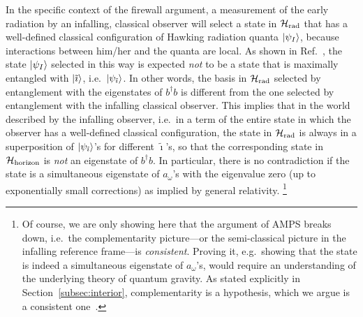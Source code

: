 \documentclass[12pt]{article}
\begin{document}
In the specific context of the firewall argument, a measurement of 
the early radiation by an infalling, classical observer will select 
a state in ${\cal H}_{\rm rad}$ that has a well-defined classical 
configuration of Hawking radiation quanta $\left| \psi_I \right>$, because 
interactions between him/her and the quanta are local.  As shown in 
Ref.~\cite{Nomura:2012sw}, the state $\left| \psi_I \right>$ selected in this 
way is expected {\it not} to be a state that is maximally entangled 
with $\left| \tilde{\imath} \right>$, i.e.\ $\left| \psi_{\tilde{\imath}} \right>$.  In 
other words, the basis in ${\cal H}_{\rm rad}$ selected by entanglement 
with the eigenstates of $b^\dagger b$ is different from the one selected 
by entanglement with the infalling classical observer.  This implies 
that in the world described by the infalling observer, i.e.\ in a term 
of the entire state in which the observer has a well-defined classical 
configuration, the state in ${\cal H}_{\rm rad}$ is always in a 
superposition of $\left| \psi_{\tilde{\imath}} \right>$'s for different 
$\tilde{\imath}$'s, so that the corresponding state in ${\cal H}_{\rm 
horizon}$ is {\it not} an eigenstate of $b^\dagger b$.  In particular, 
there is no contradiction if the state is a simultaneous eigenstate 
of $a_\omega$'s with the eigenvalue zero (up to exponentially small 
corrections) as implied by general relativity.%
\footnote{Of course, we are only showing here that the argument of AMPS 
 breaks down, i.e.\ the complementarity picture---or the semi-classical 
 picture in the infalling reference frame---is {\it consistent}. 
 Proving it, e.g.\ showing that the state is indeed a simultaneous 
 eigenstate of $a_\omega$'s, would require an understanding of the 
 underlying theory of quantum gravity.  As stated explicitly in 
 Section~\ref{subsec:interior}, complementarity is a hypothesis, 
 which we argue is a consistent one~\cite{Nomura:2012sw}.}
\end{document}
